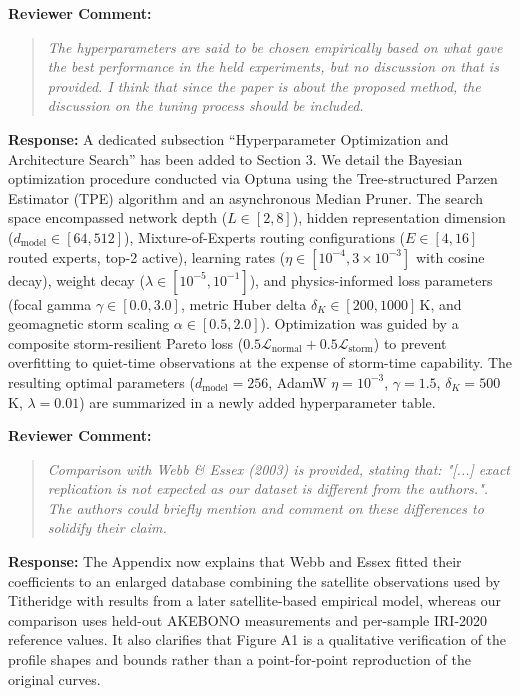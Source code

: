 \documentclass[a4paper,12pt]{article}
\newcommand{\reviewercomment}[1]{%
  \begin{samepage}%
  \par\noindent\textbf{Reviewer Comment:}\par
  \begin{quote}\itshape #1\end{quote}}
\newcommand{\filledresponse}[1]{%
  \par\noindent\textbf{Response:} #1\par
  \vspace{0.4cm}%
  \end{samepage}}
\begin{document}
\reviewercomment{The hyperparameters are said to be chosen empirically based on what gave the best performance in the
held experiments, but no discussion on that is provided. I think that since the paper is about the
proposed method, the discussion on the tuning process should be included.}
\filledresponse{A dedicated subsection ``Hyperparameter Optimization and Architecture Search'' has been added to Section 3. We detail the Bayesian optimization procedure conducted via Optuna using the Tree-structured Parzen Estimator (TPE) algorithm and an asynchronous Median Pruner. The search space encompassed network depth ($L \in [2, 8]$), hidden representation dimension ($d_{\text{model}} \in [64, 512]$), Mixture-of-Experts routing configurations ($E \in [4, 16]$ routed experts, top-2 active), learning rates ($\eta \in [10^{-4}, 3 \times 10^{-3}]$ with cosine decay), weight decay ($\lambda \in [10^{-5}, 10^{-1}]$), and physics-informed loss parameters (focal gamma $\gamma \in [0.0, 3.0]$, metric Huber delta $\delta_K \in [200, 1000]$\,K, and geomagnetic storm scaling $\alpha \in [0.5, 2.0]$). Optimization was guided by a composite storm-resilient Pareto loss ($0.5 \mathcal{L}_{\text{normal}} + 0.5 \mathcal{L}_{\text{storm}}$) to prevent overfitting to quiet-time observations at the expense of storm-time capability. The resulting optimal parameters ($d_{\text{model}} = 256$, AdamW $\eta = 10^{-3}$, $\gamma = 1.5$, $\delta_K = 500$\,K, $\lambda = 0.01$) are summarized in a newly added hyperparameter table.}

\reviewercomment{Comparison with Webb \& Essex (2003) is provided, stating that: "[...] exact replication is not
expected as our dataset is different from the authors.". The authors could briefly mention and
comment on these differences to solidify their claim.}
\filledresponse{The Appendix now explains that Webb and Essex fitted their coefficients to an enlarged
database combining the satellite observations used by Titheridge with results from a later
satellite-based empirical model, whereas our comparison uses held-out AKEBONO measurements and
per-sample IRI-2020 reference values. It also clarifies that Figure A1 is a qualitative verification
of the profile shapes and bounds rather than a point-for-point reproduction of the original curves.}
\end{document}
